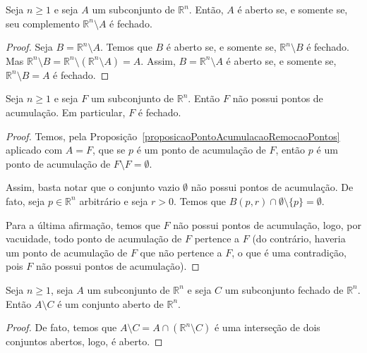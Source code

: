\begin{corollary}
    Seja $n\geq 1$ e seja $A$ um subconjunto de $\mathbb R^n$.
    Então, $A$ é aberto se, e somente se, seu complemento $\mathbb R^n\setminus A$ é fechado.
\end{corollary}
\begin{proof}
    Seja $B=\mathbb R^n\setminus A$.
    Temos que $B$ é aberto se, e somente se, $\mathbb R^n\setminus B$ é fechado.
    Mas $\mathbb R^n\setminus B = \mathbb R^n\setminus (\mathbb R^n\setminus A) = A$.
    Assim, $B=\mathbb R^n\setminus A$ é aberto se, e somente se, $\mathbb R^n\setminus B = A$ é fechado.
\end{proof}

\begin{proposition}
    Seja $n\geq 1$ e seja $F$ um subconjunto de $\mathbb R^n$.
    Então $F$ não possui pontos de acumulação.
    Em particular, $F$ é fechado.
\end{proposition}
\begin{proof}
    Temos, pela Proposição~\ref{proposicaoPontoAcumulacaoRemocaoPontos} aplicado com $A=F$, que se $p$ é um ponto de acumulação de $F$, então $p$ é um ponto de acumulação de $F\setminus F=\emptyset$.

    Assim, basta notar que o conjunto vazio $\emptyset$ não possui pontos de acumulação.
    De fato, seja $p \in \mathbb R^n$ arbitrário e seja $r>0$.
    Temos que $B(p, r)\cap \emptyset\setminus\{p\} = \emptyset$.

    Para a última afirmação, temos que $F$ não possui pontos de acumulação, logo, por vacuidade, todo ponto de acumulação de $F$ pertence a $F$ (do contrário, haveria um ponto de acumulação de $F$ que não pertence a $F$, o que é uma contradição, pois $F$ não possui pontos de acumulação).
\end{proof}

\begin{proposition}
    Seja $n\geq 1$, seja $A$ um subconjunto de $\mathbb R^n$ e seja $C$ um subconjunto fechado de $\mathbb R^n$.
    Então $A\setminus C$ é um conjunto aberto de $\mathbb R^n$.
\end{proposition}
\begin{proof}
    De fato, temos que $A\setminus C = A\cap(\mathbb R^n\setminus C)$ é uma interseção de dois conjuntos abertos, logo, é aberto.
\end{proof}
